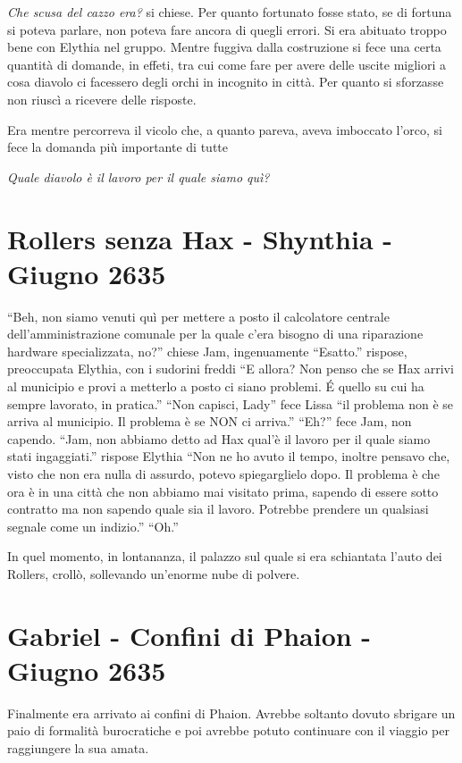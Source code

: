     \emph{Che scusa del cazzo era?} si chiese. Per quanto fortunato fosse
    stato, se di fortuna si poteva parlare, non poteva fare ancora di
    quegli errori. Si era abituato troppo bene con Elythia nel gruppo.
    Mentre fuggiva dalla costruzione si fece una certa quantità di domande,
    in effeti, tra cui come fare per avere delle uscite migliori a cosa
    diavolo ci facessero degli orchi in incognito in città. Per quanto si
    sforzasse non riuscì a ricevere delle risposte.

    Era mentre percorreva il vicolo che, a quanto pareva, aveva imboccato
    l'orco, si fece la domanda più importante di tutte

    \emph{Quale diavolo è il lavoro per il quale siamo quì?}

    \section{Rollers senza Hax - Shynthia - Giugno 2635}
    ``Beh, non siamo venuti quì per mettere a posto il calcolatore centrale
    dell'amministrazione comunale per la quale c'era bisogno di una
    riparazione hardware specializzata, no?'' chiese Jam, ingenuamente
    ``Esatto.'' rispose, preoccupata Elythia, con i sudorini freddi ``E
    allora? Non penso che se Hax arrivi al municipio e provi a metterlo a
    posto ci siano problemi. \'E quello su cui ha sempre lavorato, in
    pratica.'' ``Non capisci, Lady'' fece Lissa ``il problema non è se
    arriva al municipio. Il problema è se NON ci arriva.'' ``Eh?'' fece
    Jam, non capendo. ``Jam, non abbiamo detto ad Hax qual'è il lavoro per
    il quale siamo stati ingaggiati.'' rispose Elythia ``Non ne ho avuto il
    tempo, inoltre pensavo che, visto che non era nulla di assurdo, potevo
    spiegarglielo dopo. Il problema è che ora è in una città che non
    abbiamo mai visitato prima, sapendo di essere sotto contratto ma non
    sapendo quale sia il lavoro. Potrebbe prendere un qualsiasi segnale
    come un indizio.'' ``Oh.''

    In quel momento, in lontananza, il palazzo sul quale si era schiantata
    l'auto dei Rollers, crollò, sollevando un'enorme nube di polvere.

    \section{Gabriel - Confini di Phaion - Giugno 2635}
    Finalmente era arrivato ai confini di Phaion. Avrebbe soltanto dovuto
    sbrigare un paio di formalità burocratiche e poi avrebbe potuto
    continuare con il viaggio per raggiungere la sua amata.

